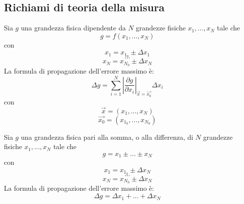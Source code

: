 \subsection{Richiami di teoria della misura}
Sia $g$ una grandezza fisica dipendente da $N$ grandezze fisiche $x_1,...,x_N$ tale che
\begin{equation}
	g=f(x_1,...,x_N)
\end{equation}
con
\begin{equation}
	x_1 = x_{1_0}\pm \Delta x_1
\end{equation}
$$ ... $$
\begin{equation}
	x_N = x_{N_0}\pm \Delta x_N
\end{equation}
La formula di propagazione dell'errore massimo è:
\begin{equation}
	\Delta g=\displaystyle\sum_{i=1}^{N}\left|\frac{\partial g}{\partial x_i}\right|_{\vec{x}=\vec{x_0}}\Delta x_i
\end{equation}
con
\begin{equation}
	\vec{x}=(x_1,...,x_N)
\end{equation}
\begin{equation}
	\vec{x_0}=(x_{1_0},...,x_{N_0})
\end{equation}

Sia $g$ una grandezza fisica pari alla somma, o alla differenza, di $N$ grandezze fisiche $x_1,...,x_N$ tale che
\begin{equation}
	g=x_1\pm ...\pm x_N
\end{equation}
con
\begin{equation}
	x_1=x_{1_0}\pm \Delta x_N
\end{equation}
$$ ... $$
\begin{equation}
	x_N=x_{N_0}\pm \Delta x_N
\end{equation}
La formula di propagazione dell'errore massimo è:
\begin{equation}
	\Delta g=\Delta x_1 + ... + \Delta x_N
\end{equation}
